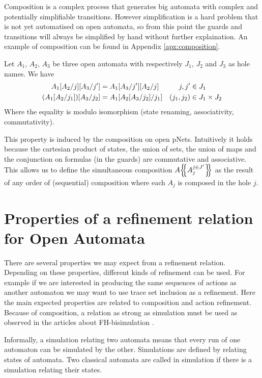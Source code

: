 \documentclass{article}
\begin{document}
Composition is a complex process that generates big automata with complex and potentially simplifiable transitions.
However simplification is a hard problem that is not yet automatised on open automata, so from this point the guards and transitions will always be simplified by hand without further explaination.
An example of composition can be found in Appendix \ref{apx:composition}.
\begin{prop}
Let \(A_1\), \(A_2\), \(A_3\) be three open automata with respectively \(J_1\), \(J_2\) and \(J_3\) as hole names.
We have
\begin{align*}
	A_1{\left[A_2\middle/j\right]}{\left[A_3\middle/j'\right]} & = A_1{\left[A_3\middle/j'\right]}{\left[A_2\middle/j\right]} & j, j' & \in J_1 \\
	{\left(A_1{\left[A_2\middle/j_1\right]}\right)}{\left[A_3\middle/j_2\right]} & = A_1{\left[A_2{\left[A_3\middle/j_2\right]}\middle/j_1\right]} & {\left(j_1, j_2\right)} & \in J_1 \times J_2
\end{align*}
Where the equality is modulo isomorphism (state renaming, associativity, commutativity).
\end{prop}
This property is induced by the composition on open pNets.
Intuitively it holds because the cartesian product of states, the union of sets, the union of maps and the conjunction on formulas (in the guards) are commutative and associative.
This allows us to define the simultaneous composition \(A{\left\{\!\!{\left\{A_j^{j \in J'}\right\}}\!\!\right\}}\) as the result of any order of (sequential) composition where each \(A_j\) is composed in the hole \(j\). %


\section{Properties of a refinement relation for Open Automata}\label{sec:proofelts}
There are several properties we may expect from a refinement relation.
Depending on these properties, different kinds of refinement can be used.
For example if we are interested in producing the same sequences of actions as another automaton we may want to use trace set inclusion as a refinement.
Here the main expected properties are related to composition and action refinement. %
Because of composition, a relation as strong as simulation must be used as observed in the articles about FH-bisimulation \cite{henrio:01055091}.

Informally, a simulation relating two automata means that every run of one automaton can be simulated by the other.
Simulations are defined by relating states of automata.
Two classical automata are called in simulation if there is a simulation relating their states.
\end{document}
